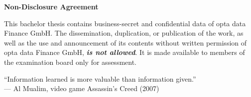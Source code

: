 

\begin{center}
    \Large\textbf{Non-Disclosure Agreement}
\end{center}
\noindent This bachelor thesis contains business-secret and confidential data of opta data Finance GmbH. The dissemination, duplication, or publication of the work, as well as the use and announcement of its contents without written permission of opta data Finance GmbH, \textbf{\textit{is not allowed}}. It is made available to members of the examination board only for assessment.\vspace{4cm}

                   \begin{center}
              \color{teal}
                        \large{“Information learned is more valuable than information given.”}\\
                      \color{black} 
                                                 {— Al Mualim, video game Assassin’s Creed (2007)}  
                   \end{center}